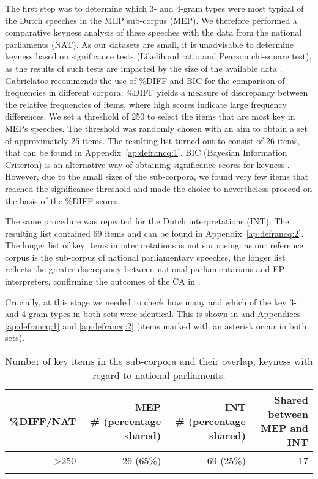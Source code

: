 \documentclass[output=paper]{langscibook}
\begin{document}
The first step was to determine which 3- and 4-gram types were most typical of the Dutch speeches in the MEP sub-corpus (MEP). We therefore performed a comparative keyness analysis of these speeches with the data from the national parliaments (NAT). As our datasets are small, it is unadvisable to determine keyness based on significance tests (Likelihood ratio and Pearson chi-square test), as the results of such tests are impacted by the size of the available data \citep{Gabrielatos2018}. Gabrielatos recommends the use of \%DIFF and BIC for the comparison of frequencies in different corpora. \%DIFF yields a measure of discrepancy between the relative frequencies of items, where high scores indicate large frequency differences. We set a threshold of 250 to select the items that are most key in MEPs speeches. The threshold was randomly chosen with an aim to obtain a set of approximately 25 items. The resulting list turned out to consist of 26 items, that can be found in Appendix~\ref{ap:defrancq:1}. BIC (Bayesian Information Criterion) is an alternative way of obtaining significance scores for keyness \citep{Gabrielatos2018}. However, due to the small sizes of the sub-corpora, we found very few items that reached the significance threshold and made the choice to nevertheless proceed on the basis of the \%DIFF scores.

The same procedure was repeated for the Dutch interpretations (INT). The resulting list contained 69 items and can be found in Appendix~\ref{ap:defrancq:2}. The longer list of key items in interpretations is not surprising: as our reference corpus is the sub-corpus of national parliamentary speeches, the longer list reflects the greater discrepancy between national parliamentarians and EP interpreters, confirming the outcomes of the CA in \citet{DefrancqPlevoetsforthcoming}. 

Crucially, at this stage we needed to check how many and which of the key 3- and 4-gram types in both sets were identical. This is shown in  and Appendices \ref{ap:defrancq:1} and \ref{ap:defrancq:2} (items marked with an asterisk occur in both sets).

\begin{table}
\small
\begin{tabularx}{\textwidth}{rrrr}

\lsptoprule
{\bfseries \%DIFF/NAT} & \makecell[rt]{{\bfseries MEP}\\ 
{\bfseries \# (percentage shared)}} & \makecell[rt]{{\bfseries INT}\\
{\bfseries \# (percentage shared)}} & \makecell[rt]{\bfseries Shared between\\\bfseries MEP and INT}\\
\midrule
>250 & 26 (65\%) & 69 (25\%) & 17\\
\lspbottomrule
\end{tabularx}

\caption{Number of key items in the sub-corpora and their overlap; keyness with regard to national parliaments.}
\label{tab:defrancq:1}
\end{table}
\end{document}
